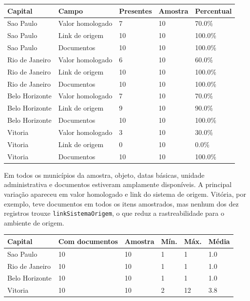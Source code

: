 \documentclass[12pt]{article}
\newcounter{none}
\begin{document}
{\def\LTcaptype{none} %
\begin{longtable}[]{@{}lllll@{}}
\toprule\noalign{}
Capital & Campo & Presentes & Amostra & Percentual \\
\midrule\noalign{}
\endhead
\bottomrule\noalign{}
\endlastfoot
Sao Paulo & Valor homologado & 7 & 10 & 70.0\% \\
Sao Paulo & Link de origem & 10 & 10 & 100.0\% \\
Sao Paulo & Documentos & 10 & 10 & 100.0\% \\
Rio de Janeiro & Valor homologado & 6 & 10 & 60.0\% \\
Rio de Janeiro & Link de origem & 10 & 10 & 100.0\% \\
Rio de Janeiro & Documentos & 10 & 10 & 100.0\% \\
Belo Horizonte & Valor homologado & 7 & 10 & 70.0\% \\
Belo Horizonte & Link de origem & 9 & 10 & 90.0\% \\
Belo Horizonte & Documentos & 10 & 10 & 100.0\% \\
Vitoria & Valor homologado & 3 & 10 & 30.0\% \\
Vitoria & Link de origem & 0 & 10 & 0.0\% \\
Vitoria & Documentos & 10 & 10 & 100.0\% \\
\end{longtable}
}

Em todos os municípios da amostra, objeto, datas básicas, unidade
administrativa e documentos estiveram amplamente disponíveis. A
principal variação apareceu em valor homologado e link do sistema de
origem. Vitória, por exemplo, teve documentos em todos os itens
amostrados, mas nenhum dos dez registros trouxe
\texttt{linkSistemaOrigem}, o que reduz a rastreabilidade para o
ambiente de origem.

{\def\LTcaptype{none} %
\begin{longtable}[]{@{}llllll@{}}
\toprule\noalign{}
Capital & Com documentos & Amostra & Mín. & Máx. & Média \\
\midrule\noalign{}
\endhead
\bottomrule\noalign{}
\endlastfoot
Sao Paulo & 10 & 10 & 1 & 1 & 1.0 \\
Rio de Janeiro & 10 & 10 & 1 & 1 & 1.0 \\
Belo Horizonte & 10 & 10 & 1 & 1 & 1.0 \\
Vitoria & 10 & 10 & 2 & 12 & 3.8 \\
\end{longtable}
}
\end{document}
